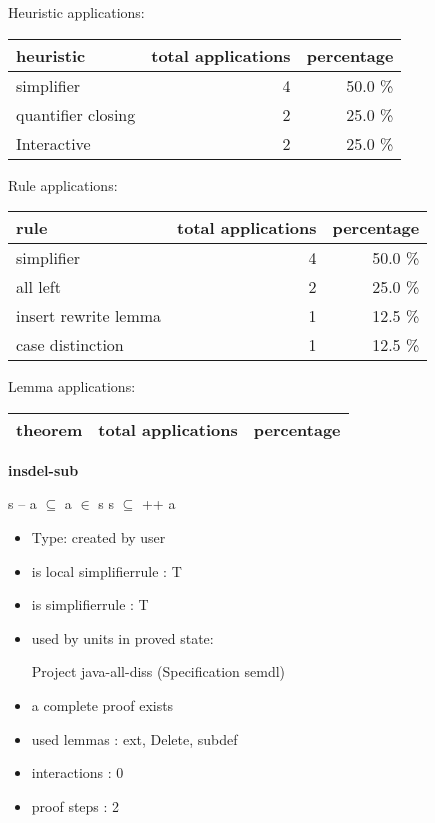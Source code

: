 \documentclass[a4paper]{article}
\begin{document}
\medskip


Heuristic applications:

\begin{supertabular}{l|r|r}
heuristic	& total applications & percentage \\ \hline
simplifier & 4 & 50.0 \% \\
quantifier closing & 2 & 25.0 \% \\
Interactive & 2 & 25.0 \% \\

\end{supertabular}

Rule applications:

\begin{supertabular}{l|r|r}
rule	        & total applications & percentage \\ \hline
simplifier & 4 & 50.0 \% \\
all left & 2 & 25.0 \% \\
insert rewrite lemma & 1 & 12.5 \% \\
case distinction & 1 & 12.5 \% \\

\end{supertabular}

Lemma applications:

\begin{supertabular}{l|r|r}
theorem	        & total applications & percentage \\ \hline

\end{supertabular}
\pagebreak

{\LARGE\bf insdel-sub}\label{lemma-insdel-sub}

\medskip

 \Fol \Not s -- a $\subseteq$  \And a $\in$ s \Imp \Not s $\subseteq$  ++ a

\begin{itemize}

\item Type: created by user

\item is local simplifierrule : T
\item is simplifierrule : T
\item used by units in proved state:

Project java-all-diss (Specification semdl)
\item       a complete proof exists
\item       used lemmas  : ext, Delete, subdef
\item       interactions : 0
\item       proof steps  : 2
\end{itemize}
\end{document}
